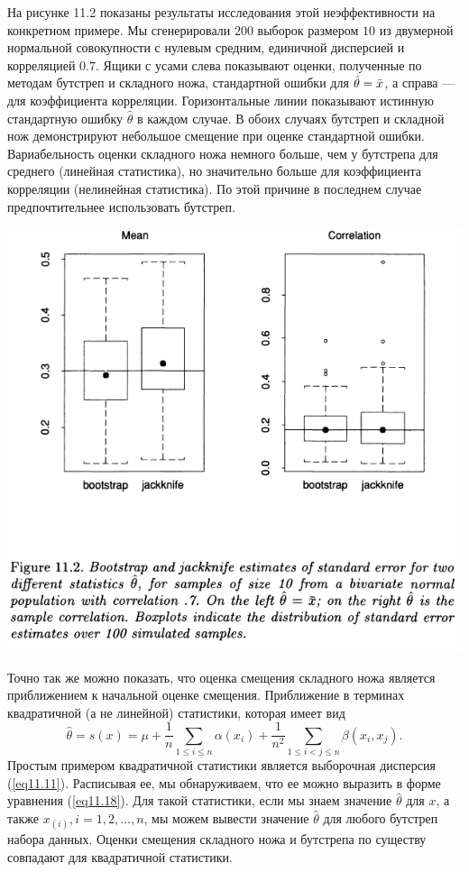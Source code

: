 На рисунке 11.2 показаны результаты исследования этой неэффективности на конкретном примере. Мы сгенерировали $200$ выборок размером $10$ из двумерной нормальной совокупности с нулевым средним, единичной дисперсией и корреляцией $0.7$. Ящики с усами слева показывают оценки, полученные по методам бутстреп и складного ножа, стандартной ошибки для $\hat{\theta} = \Bar{x}$, а справа --- для коэффициента корреляции. Горизонтальные линии показывают истинную стандартную ошибку $\hat{\theta}$ в каждом случае. В обоих случаях бутстреп и складной нож демонстрируют небольшое смещение при оценке стандартной ошибки. Вариабельность оценки складного ножа немного больше, чем у бутстрепа для среднего (линейная статистика), но значительно больше для коэффициента корреляции (нелинейная статистика). По этой причине в последнем случае предпочтительнее использовать бутстреп. %

\noindent
\includegraphics[width=\linewidth]{11/f11.2.png}
\newline

Точно так же можно показать, что оценка смещения складного ножа является приближением к начальной оценке смещения. Приближение в терминах квадратичной (а не линейной) статистики, которая имеет вид
\begin{equation}\label{eq11.18}
    \hat{\theta} = s(x) = \mu + \frac{1}{n}\sum\limits_{1 \leq i \leq n}\alpha(x_i) + \frac{1}{n^2}\sum\limits_{1 \leq i < j \leq n}\beta(x_i, x_j).
\end{equation}
Простым примером квадратичной статистики является выборочная дисперсия (\ref{eq11.11}). Расписывая ее, мы обнаруживаем, что ее можно выразить в форме уравнения (\ref{eq11.18}). Для такой статистики, если мы знаем значение $\hat{\theta}$ для $x$, а также $x_{(i)}, i = 1,2, \dots, n$, мы можем вывести значение $\hat{\theta}$ для любого бутстреп набора данных. Оценки смещения складного ножа и бутстрепа по существу совпадают для квадратичной статистики.